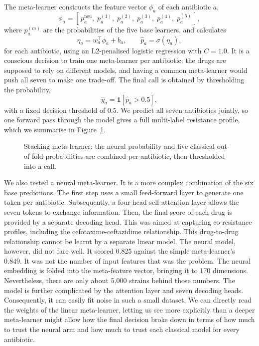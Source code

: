 The meta-learner constructs the feature vector $\phi_a$ of each antibiotic $a$,
\begin{equation}
\phi_a = \left[\,p^{\mathrm{neu}}_a,\; p^{(1)}_a,\; p^{(2)}_a,\; p^{(3)}_a,\; p^{(4)}_a,\; p^{(5)}_a\,\right],
\label{eq:meta_features}
\end{equation}
where $p^{(m)}_a$ are the probabilities of the five base learners, and calculates
\begin{equation}
\eta_a = w_a^\top \phi_a + b_a,
\qquad
\hat{p}_a = \sigma(\eta_a),
\label{eq:meta_logit}
\end{equation}
for each antibiotic, using an L2-penalised logistic regression with $C = 1.0$. It is a conscious decision to train one meta-learner per antibiotic: the drugs are supposed to
rely on different models, and having a common meta-learner would push all seven to make one
trade-off. The final call is obtained by thresholding the probability,
\begin{equation}
\hat{y}_a = \mathbf{1}\!\left[\hat{p}_a > 0.5\right],
\label{eq:decision}
\end{equation}
with a fixed decision threshold of 0.5. We predict all seven antibiotics jointly, so one
forward pass through the model gives a full multi-label resistance profile, which we
summarise in Figure~\ref{fig:stacking}.

\begin{figure}[H]
  \centering
  \resizebox{\textwidth}{!}{}
  \caption{Stacking meta-learner: the neural probability and five classical out-of-fold probabilities are combined per antibiotic, then thresholded into a call.}
  \label{fig:stacking}
\end{figure}

We also tested a neural meta-learner. It is a more complex combination of the six base
predictions. The first step uses a small feed-forward layer to generate one token per
antibiotic. Subsequently, a four-head self-attention layer allows the seven tokens to exchange
information. Then, the final score of each drug is provided by a separate decoding head. This
was aimed at capturing co-resistance profiles, including the cefotaxime-ceftazidime
relationship. This drug-to-drug relationship cannot be learnt by a separate linear model. The
neural model, however, did not fare well. It scored 0.825 against the simple meta-learner's
0.849. It was not the number of input features that was the problem. The neural embedding is
folded into the meta-feature vector, bringing it to 170 dimensions. Nevertheless, there are
only about 5{,}000 strains behind those numbers. The model is further complicated by the
attention layer and seven decoding heads. Consequently, it can easily fit noise in such a
small dataset. We can directly read the weights of the linear meta-learner, letting us see
more explicitly than a deeper meta-learner might allow how the final decision broke down in
terms of how much to trust the neural arm and how much to trust each classical model for every
antibiotic.

